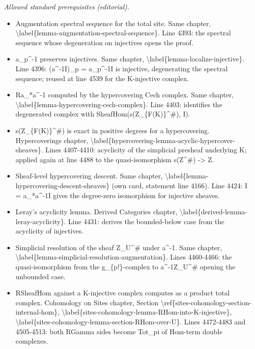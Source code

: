 \documentclass{stacks-project}
\theoremstyle{plain}
\theoremstyle{definition}
\theoremstyle{remark}
\numberwithin{equation}{subsection}
\begin{document}
\noindent\textit{Allowed standard prerequisites (editorial).}\begin{itemize}
\item Augmentation spectral sequence for the total site. Same chapter, \textbackslash{}label\{lemma-augmentation-spectral-sequence\}. Line 4393: the spectral sequence whose degeneration on injectives opens the proof.
\item a\_p\textasciicircum{}-1 preserves injectives. Same chapter, \textbackslash{}label\{lemma-localize-injective\}. Line 4396: (a\textasciicircum{}-1I)\_p = a\_p\textasciicircum{}-1I is injective, degenerating the spectral sequence; reused at line 4539 for the K-injective complex.
\item Ra\_*a\textasciicircum{}-1 computed by the hypercovering Cech complex. Same chapter, \textbackslash{}label\{lemma-hypercovering-cech-complex\}. Line 4403: identifies the degenerated complex with SheafHom(s(Z\_\{F(K)\}\textasciicircum{}\#), I).
\item s(Z\_\{F(K)\}\textasciicircum{}\#) is exact in positive degrees for a hypercovering. Hypercoverings chapter, \textbackslash{}label\{hypercovering-lemma-acyclic-hypercover-sheaves\}. Lines 4407-4410: acyclicity of the simplicial presheaf underlying K; applied again at line 4488 to the quasi-isomorphism s(Z\textasciicircum{}\#) -> Z.
\item Sheaf-level hypercovering descent. Same chapter, \textbackslash{}label\{lemma-hypercovering-descent-sheaves\} (own card, statement line 4166). Line 4424: I = a\_*a\textasciicircum{}-1I gives the degree-zero isomorphism for injective sheaves.
\item Leray's acyclicity lemma. Derived Categories chapter, \textbackslash{}label\{derived-lemma-leray-acyclicity\}. Line 4431: derives the bounded-below case from the acyclicity of injectives.
\item Simplicial resolution of the sheaf Z\_U\textasciicircum{}\# under a\textasciicircum{}-1. Same chapter, \textbackslash{}label\{lemma-simplicial-resolution-augmentation\}. Lines 4460-4466: the quasi-isomorphism from the g\_\{p!\}-complex to a\textasciicircum{}-1Z\_U\textasciicircum{}\# opening the unbounded case.
\item RSheafHom against a K-injective complex computes as a product total complex. Cohomology on Sites chapter, Section \textbackslash{}ref\{sites-cohomology-section-internal-hom\}, \textbackslash{}label\{sites-cohomology-lemma-RHom-into-K-injective\}, \textbackslash{}label\{sites-cohomology-lemma-section-RHom-over-U\}. Lines 4472-4483 and 4505-4513: both RGamma sides become Tot\_pi of Hom-term double complexes.

\end{itemize}
\end{document}
